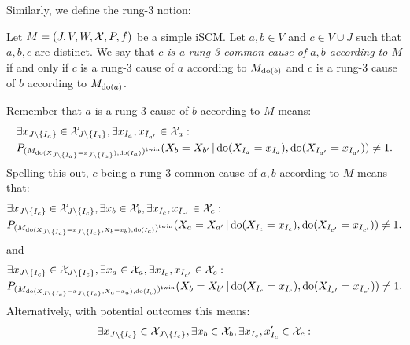 Similarly, we define the rung-3 notion:
\begin{Def}\label{def:scm_rung3_common_cause_of}
  Let $M = \left ( J, V, W, \mathcal{X}, P, f \right )$ be a simple iSCM.
  Let $a, b \in V$ and $c \in V \cup J$ such that $a,b,c$ are distinct.
  We say that \emph{$c$ is a rung-3 common cause of $a,b$ according to $M$} if and only if $c$ is a rung-3 cause of $a$ according to $M_{\operatorname{do}(b)}$ and $c$ is a rung-3 cause of $b$ according to $M_{\operatorname{do}(a)}$.
\end{Def}
\begin{Rem}\label{rem:scm_rung3_common_cause_of}
  Remember that $a$ is a rung-3 cause of $b$ according to $M$ means:
    \begin{equation*}\begin{split}
      & \exists x_{J\setminus\{I_a\}} \in \mathcal{X}_{J\setminus\{I_a\}}, \exists x_{I_a},x_{I_{a'}} \in \mathcal{X}_a: \\
      & P_{(M_{\operatorname{do}(X_{J\setminus\{I_a\}}=x_{J\setminus\{I_a\}}),\operatorname{do}(I_a)})^{\mathrm{twin}}}(X_b = X_{b'} \operatorname*{|} \operatorname{do}(X_{I_a}=x_{I_a}),\operatorname{do}(X_{I_{a'}}=x_{I_{a'}})) \ne 1.
    \end{split}\end{equation*}
  Spelling this out, $c$ being a rung-3 common cause of $a,b$ according to $M$ means that:
    \begin{equation*}\begin{split}
      & \exists x_{J\setminus\{I_c\}} \in \mathcal{X}_{J\setminus\{I_c\}}, \exists x_b \in \mathcal{X}_b, \exists x_{I_c},x_{I_{c'}} \in \mathcal{X}_c: \\
      & P_{(M_{\operatorname{do}(X_{J\setminus\{I_c\}}=x_{J\setminus\{I_c\}},X_b=x_b),\operatorname{do}(I_c)})^{\mathrm{twin}}}(X_a = X_{a'} \operatorname*{|} \operatorname{do}(X_{I_c}=x_{I_c}),\operatorname{do}(X_{I_{c'}}=x_{I_{c'}})) \ne 1.
    \end{split}\end{equation*}
  and
    \begin{equation*}\begin{split}
      & \exists x_{J\setminus\{I_c\}} \in \mathcal{X}_{J\setminus\{I_c\}}, \exists x_a \in \mathcal{X}_a, \exists x_{I_c},x_{I_{c'}} \in \mathcal{X}_c: \\
      & P_{(M_{\operatorname{do}(X_{J\setminus\{I_c\}}=x_{J\setminus\{I_c\}},X_a=x_a),\operatorname{do}(I_c)})^{\mathrm{twin}}}(X_b = X_{b'} \operatorname*{|} \operatorname{do}(X_{I_c}=x_{I_c}),\operatorname{do}(X_{I_{c'}}=x_{I_{c'}})) \ne 1.
    \end{split}\end{equation*}
  Alternatively, with potential outcomes this means:
    \begin{equation*}\begin{split}
      & \exists x_{J\sm\{I_c\}} \in \CX_{J\sm\{I_c\}}, \exists x_b \in \CX_b, \exists x_{I_c},x_{I_{c}}' \in \CX_c: \\

\end{split}
\end{equation*}
\end{Rem}
